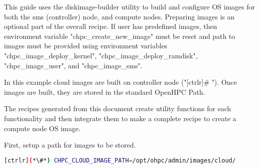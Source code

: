 

   This guide uses the diskimage-builder utility to build and configure OS images for both the sms (controller) node, and compute nodes.  Preparing images is an optional part of the overall recipe. If user has predefined images, then environment variable "chpc\_create\_new\_image" must be reset and path to images must be provided using environment variables "chpc\_image\_deploy\_kernel", "chpc\_image\_deploy\_ramdisk", "chpc\_image\_user", and "chpc\_image\_sms". 

	In this example cloud images are built on controller node ("[ctrlr]\# "). Once images are built, they are stored in the standard OpenHPC Path. 
	
	The recipes generated from this document create utility functions for each functionality and then integrate them to make a complete recipe to create a compute node OS image. 
	
	First, setup a path for images to be stored.


\begin{lstlisting}[language=bash,keywords={},upquote=true]
[ctrlr](*\#*) CHPC_CLOUD_IMAGE_PATH=/opt/ohpc/admin/images/cloud/
\end{lstlisting}
